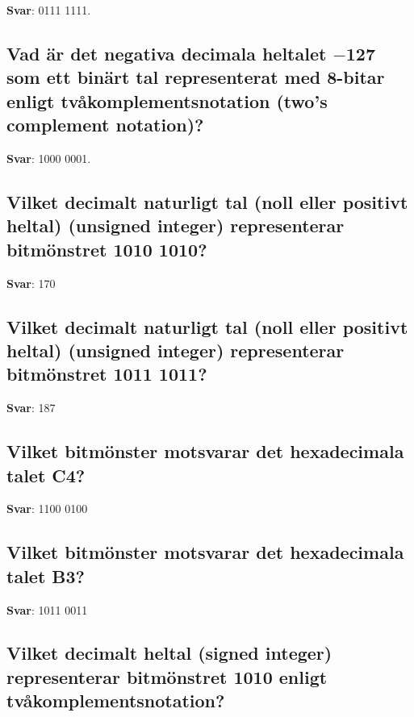 \documentclass[a4paper,11pt,oneside]{article}
\begin{document}
\begin{sloppypar}
\textbf{Svar}: 0111 1111.



\subsection{Vad \"ar det negativa decimala heltalet \ensuremath{-}127 som ett bin\"art tal representerat med 8-bitar enligt tv\r{a}komplementsnotation (two{\textquoteright}s complement notation)?}

\label{q:372:sa:sv:True}

\textbf{Svar}: 1000 0001.



\subsection{Vilket decimalt naturligt tal (noll eller positivt heltal) (unsigned integer) representerar bitm\"onstret 1010 1010?}

\label{q:373:sa:sv:True}

\textbf{Svar}: 170



\subsection{Vilket decimalt naturligt tal (noll eller positivt heltal) (unsigned integer) representerar bitm\"onstret 1011 1011?}

\label{q:374:sa:sv:True}

\textbf{Svar}: 187



\subsection{Vilket bitm\"onster motsvarar det hexadecimala talet C4?}

\label{q:375:sa:sv:True}

\textbf{Svar}: 1100 0100



\subsection{Vilket bitm\"onster motsvarar det hexadecimala talet B3?}

\label{q:376:sa:sv:True}

\textbf{Svar}: 1011 0011



\subsection{Vilket decimalt heltal (signed integer) representerar bitm\"onstret 1010 enligt tv\r{a}komplementsnotation?}


\end{sloppypar}
\end{document}
